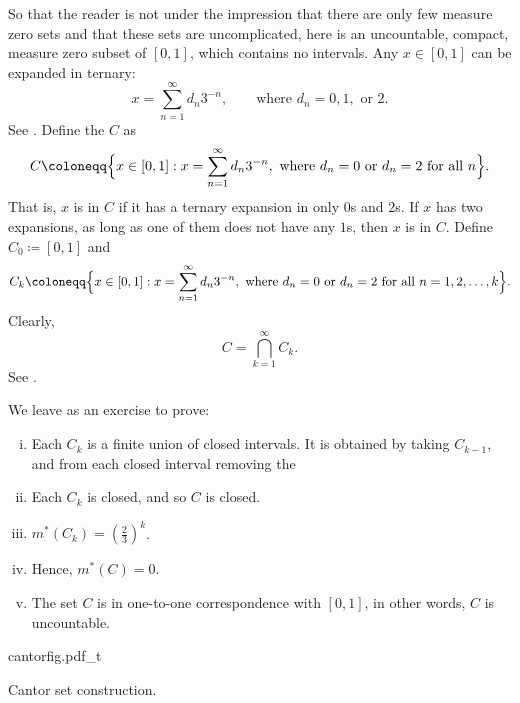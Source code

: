 \begin{example} \label{example:cantor}
So that the reader is not under the impression that there are only few
measure zero sets and that these sets are uncomplicated,
here is an uncountable, compact, measure zero subset of $[0,1]$, which
contains no intervals.
Any $x \in [0,1]$ can be expanded in ternary:
\begin{equation*}
x = \sum_{n=1}^\infty d_n 3^{-n} ,
\qquad \text{where } d_n=0, 1, \text{ or } 2.
\end{equation*}
See .
Define the \emph{} $C$ as
\begin{equation*}
C \coloneqq \Bigl\{ x \in [0,1] : x = \sum_{n=1}^\infty d_n 3^{-n},
\text{ where } d_n = 0 \text{ or } d_n = 2 \text{ for all } n \Bigr\} .
\end{equation*}
That is, $x$ is in $C$ if it has a ternary expansion in only $0$s and
$2$s.  If $x$ has two expansions, as long as one of them does not have any
$1$s, then $x$ is in $C$.
Define $C_0 \coloneqq [0,1]$ and
\begin{equation*}
C_k \coloneqq \Bigl\{ x \in [0,1] : x = \sum_{n=1}^\infty d_n 3^{-n},
\text{ where } d_n = 0 \text{ or } d_n = 2 \text{ for all } n=1,2,\ldots,k \Bigr\} .
\end{equation*}
Clearly,
\begin{equation*}
C = \bigcap_{k=1}^\infty C_k .
\end{equation*}
See .

We leave as an exercise to prove:
\begin{enumerate}[(i)]
\item Each $C_k$ is a finite union of closed intervals.  It is obtained by
taking $C_{k-1}$, and from each closed interval removing the
\item Each $C_k$ is closed, and so $C$ is closed.
\item 
$m^*(C_k) = {\left(\frac{2}{3}\right)}^k$.
\item Hence,
$m^*(C) = 0$.
\item The set $C$ is in one-to-one correspondence with $[0,1]$, in other
words, $C$ is
uncountable.
\end{enumerate}
\begin{myfigureht}
{cantorfig.pdf_t}
\caption{Cantor set construction.\label{fig:cantor}}
\end{myfigureht}
\end{example}


